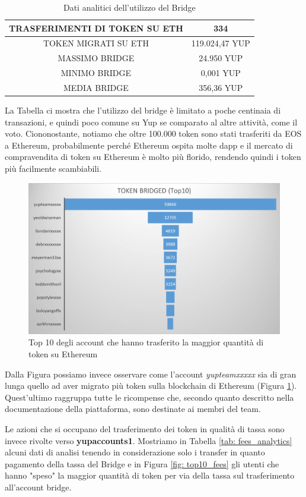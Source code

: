 \begin{table}[h]
\centering
\begin{tabular}{ |c|c|}
 \hline
 TRASFERIMENTI DI TOKEN SU ETH & 334 \\
 \hline
 TOKEN MIGRATI SU ETH & 119.024,47 YUP \\
 \hline
 MASSIMO BRIDGE & 24.950 YUP \\
 \hline
 MINIMO BRIDGE & 0,001 YUP \\
 \hline
 MEDIA BRIDGE & 356,36 YUP \\
 \hline
\end{tabular}
\caption{Dati analitici dell'utilizzo del Bridge}
\label{tab: bridge_analytics}
\end{table}

La Tabella ci mostra che l'utilizzo del bridge è limitato a poche centinaia di transazioni, e quindi poco comune su Yup se comparato al altre attività, come il voto.
Ciononostante, notiamo che oltre 100.000 token sono stati trasferiti da EOS a Ethereum, probabilmente perché Ethereum ospita molte dapp e il mercato di compravendita di token su Ethereum è molto più florido, rendendo quindi i token più facilmente scambiabili.

\begin{figure}[t]
    \centering
    \includegraphics[width=.7\textwidth]{graphs/top10_bridge.png}
    \caption{Top 10 degli account che hanno trasferito la maggior quantità di token su Ethereum}
    \label{fig: top10_bridge}
\end{figure}

Dalla Figura possiamo invece osservare come l'account \textit{yupteamxxxxx} sia di gran lunga quello ad aver migrato più token sulla blockchain di Ethereum (Figura \ref{fig: top10_bridge}). Quest'ultimo raggruppa tutte le ricompense che, secondo quanto descritto nella documentazione della piattaforma, sono destinate ai membri del team.

Le azioni che si occupano del trasferimento dei token in qualità di tassa sono invece rivolte verso \textbf{yupaccounts1}. Mostriamo in Tabella \ref{tab: fees_analytics} alcuni dati di analisi tenendo in considerazione solo i transfer in quanto pagamento della tassa del Bridge e in Figura \ref{fig: top10_fees} gli utenti che hanno "speso" la maggior quantità di token per via della tassa sul trasferimento all'account bridge.

